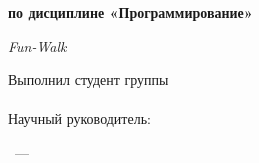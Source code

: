 \begin{titlepage}
\centering

{\small\university\par}
\vspace{0.3cm}
{\small\faculty\par}
\vspace{0.3cm}
{\small\department\par}

\vspace{3cm}

{\large\bfseries\MakeUppercase{\courseworktype}\par}
\vspace{0.8cm}
{\large\bfseries по дисциплине «Программирование»\par}
\vspace{1.2cm}
{\Large\bfseries\courseworktitle\par}

\vspace{0.5cm}
{\large\itshape Fun-Walk\par}

\vfill

\begin{flushleft}
\hspace{8cm}
\begin{minipage}{0.45\textwidth}
Выполнил студент группы \studentgroup\\
\studentname\\[1.2cm]
Научный руководитель:\\
\supervisor
\end{minipage}
\end{flushleft}

\vfill

\city\ --- \yearwork

\end{titlepage}
\clearpage
